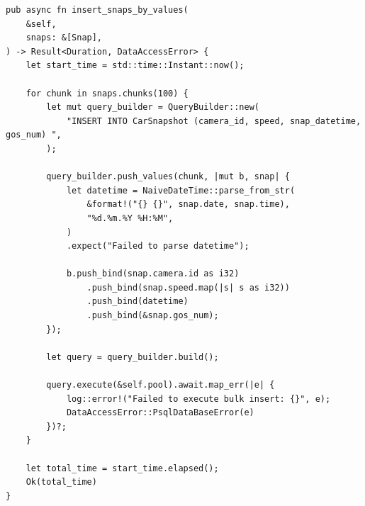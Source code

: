 \begin{center}
\captionsetup{justification=raggedright,singlelinecheck=off}
\begin{lstlisting}[label=lst:ins_by_values, caption=Пакетная вставка VALUES]
pub async fn insert_snaps_by_values(
    &self,
    snaps: &[Snap],
) -> Result<Duration, DataAccessError> {
    let start_time = std::time::Instant::now();

    for chunk in snaps.chunks(100) {
        let mut query_builder = QueryBuilder::new(
            "INSERT INTO CarSnapshot (camera_id, speed, snap_datetime, gos_num) ",
        );

        query_builder.push_values(chunk, |mut b, snap| {
            let datetime = NaiveDateTime::parse_from_str(
                &format!("{} {}", snap.date, snap.time),
                "%d.%m.%Y %H:%M",
            )
            .expect("Failed to parse datetime");

            b.push_bind(snap.camera.id as i32)
                .push_bind(snap.speed.map(|s| s as i32))
                .push_bind(datetime)
                .push_bind(&snap.gos_num);
        });

        let query = query_builder.build();

        query.execute(&self.pool).await.map_err(|e| {
            log::error!("Failed to execute bulk insert: {}", e);
            DataAccessError::PsqlDataBaseError(e)
        })?;
    }

    let total_time = start_time.elapsed();
    Ok(total_time)
}
\end{lstlisting}
\end{center}

